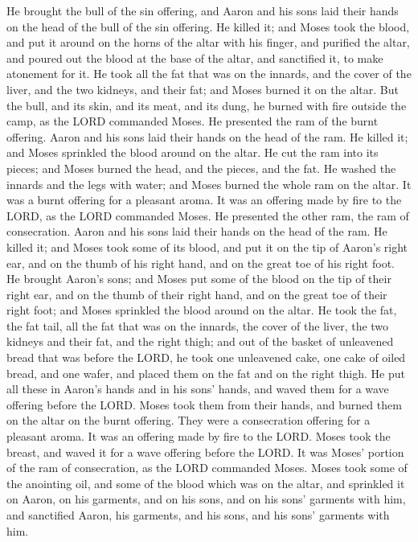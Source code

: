 \myverse{}He brought the bull of the sin offering, and Aaron and his sons
laid their hands on the head of the bull of the sin offering.
\myverse{}He killed it; and Moses took the blood, and put it around on the horns of
the altar with his finger, and purified the altar, and poured out the blood at the base of the altar,
and sanctified it, to make atonement for it.
\myverse{}He took all the fat that was on the innards, and the cover of the liver, and
the two kidneys, and their fat; and Moses burned it on the altar.
\myverse{}But the bull, and its skin, and its meat, and its dung, he burned with fire
outside the camp, as the LORD commanded Moses.
\myverse{}He presented the ram of the burnt offering. Aaron and his sons laid their
hands on the head of the ram.
\myverse{}He killed it; and Moses sprinkled the blood around on the altar.
\myverse{}He cut the ram into its pieces; and Moses burned the head, and the pieces,
and the fat.
\myverse{}He washed the innards and the legs with water; and Moses burned the whole
ram on the altar. It was a burnt offering for a pleasant aroma. It was an offering made by fire to the
LORD, as the LORD commanded Moses.
\myverse{}He presented the other ram, the ram of consecration. Aaron and his sons laid
their hands on the head of the ram.
\myverse{}He killed it; and Moses took some of its blood, and put it on the tip of Aaron’s
right ear, and on the thumb of his right hand, and on the great toe of his right foot.
\myverse{}He brought Aaron’s sons; and Moses put some of the blood on the tip of their
right ear, and on the thumb of their right hand, and on the great toe of their right foot; and Moses sprinkled
the blood around on the altar.
\myverse{}He took the fat, the fat tail, all the fat that was on the innards, the cover
of the liver, the two kidneys and their fat, and the right thigh;
\myverse{}and out of the basket of unleavened bread that was before the LORD, he took
one unleavened cake, one cake of oiled bread, and one wafer, and placed them on the fat and on the right
thigh.
\myverse{}He put all these in Aaron’s hands and in his sons’ hands, and waved them for
a wave offering before the LORD.
\myverse{}Moses took them from their hands, and burned them on the altar on the burnt
offering. They were a consecration offering for a pleasant aroma. It was an offering made by fire to the
LORD.
\myverse{}Moses took the breast, and waved it for a wave offering before the LORD. It
was Moses’ portion of the ram of consecration, as the LORD commanded Moses.
\myverse{}Moses took some of the anointing oil, and some of the blood which was on the
altar, and sprinkled it on Aaron, on his garments, and on his sons, and on his sons’ garments with him,
and sanctified Aaron, his garments, and his sons, and his sons’ garments with him.


